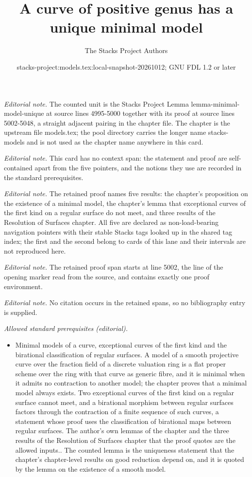 \documentclass[10pt,a4paper]{amsart}
\title{A curve of positive genus has a unique minimal model}
\author{The Stacks Project Authors}
\date{stacks-project:models.tex:local-snapshot-20261012; GNU FDL 1.2 or later}
\theoremstyle{plain}
\theoremstyle{definition}
\theoremstyle{remark}
\numberwithin{equation}{subsection}
\begin{document}
\maketitle
\noindent\textit{Editorial note.} The counted unit is the Stacks Project Lemma lemma-minimal-model-unique at source lines 4995-5000 together with its proof at source lines 5002-5048, a straight adjacent pairing in the chapter file. The chapter is the upstream file models.tex; the pool directory carries the longer name stacks-models and is not used as the chapter name anywhere in this card.\par\medskip
\noindent\textit{Editorial note.} This card has no context span: the statement and proof are self-contained apart from the five pointers, and the notions they use are recorded in the standard prerequisites.\par\medskip
\noindent\textit{Editorial note.} The retained proof names five results: the chapter's proposition on the existence of a minimal model, the chapter's lemma that exceptional curves of the first kind on a regular surface do not meet, and three results of the Resolution of Surfaces chapter. All five are declared as non-load-bearing navigation pointers with their stable Stacks tags looked up in the shared tag index; the first and the second belong to cards of this lane and their intervals are not reproduced here.\par\medskip
\noindent\textit{Editorial note.} The retained proof span starts at line 5002, the line of the opening marker read from the source, and contains exactly one proof environment.\par\medskip
\noindent\textit{Editorial note.} No citation occurs in the retained spans, so no bibliography entry is supplied.\par\medskip
\noindent\textit{Allowed standard prerequisites (editorial).}\begin{itemize}
\item Minimal models of a curve, exceptional curves of the first kind and the birational classification of regular surfaces. A model of a smooth projective curve over the fraction field of a discrete valuation ring is a flat proper scheme over the ring with that curve as generic fibre, and it is minimal when it admits no contraction to another model; the chapter proves that a minimal model always exists. Two exceptional curves of the first kind on a regular surface cannot meet, and a birational morphism between regular surfaces factors through the contraction of a finite sequence of such curves, a statement whose proof uses the classification of birational maps between regular surfaces. The author's own lemmas of the chapter and the three results of the Resolution of Surfaces chapter that the proof quotes are the allowed inputs.. The counted lemma is the uniqueness statement that the chapter's chapter-level results on good reduction depend on, and it is quoted by the lemma on the existence of a smooth model.
\end{itemize}\medskip
\end{document}
